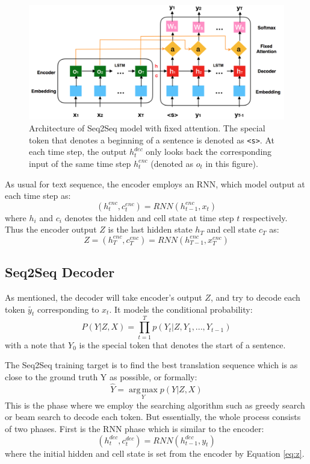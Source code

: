 \documentclass[11pt,a4paper]{article}
\begin{document}
\begin{figure}[ht]
\centering
\includegraphics[width=1.0\linewidth]{archi.png}
\caption{Architecture of Seq2Seq model with fixed attention. The special token that denotes a beginning of a sentence is denoted as \texttt{<s>}. At each time step, the output $h^{dec}_t$ only looks back the corresponding input of the same time step $h^{enc}_t$ (denoted as $o_t$ in this figure).}
\label{fig:fig_architecture}
\end{figure}
As usual for text sequence, the encoder employs an RNN, which model output at each time step as: 
  \begin{equation}
	({h^{enc}_t}, {c^{enc}_t}) = RNN(h^{enc}_{t-1}, x_t)
  \end{equation}
where $h_i$ and $c_i$ denotes the hidden and cell state at time step $t$ respectively. Thus the encoder output $Z$ is the last hidden state $h_T$ and cell state $c_T$ as:
  \begin{equation} \label{eq:z}
      {Z} = ({h^{enc}_T}, {c^{enc}_T}) = RNN(h^{enc}_{T-1}, x^{enc}_T)	
  \end{equation}

\subsection{Seq2Seq Decoder}
As mentioned, the decoder will take encoder's output $Z$, and try to decode each token $\tilde{y_t}$ corresponding to $x_t$. It models the conditional probability: 
  \begin{equation}
      P(Y|Z,X) = \prod_{t=1}^{T} p(Y_t|{Z}, Y_1, ..., Y_{t-1})
  \end{equation}
with a note that $Y_0$ is the special token that denotes the start of a sentence. 

The Seq2Seq training target is to find the best translation sequence which is as close to the ground truth Y as possible, or formally:
  \begin{equation}
      \widehat{Y} = \operatorname*{arg\,max}_{Y} p(Y|Z, X) 
  \end{equation}
This is the phase where we employ the searching algorithm such as greedy search or beam search to decode each token. But essentially, the whole process consists of two phases. First is the RNN phase which is similar to the encoder: 
  \begin{equation}
      (h^{dec}_t, c^{dec}_t) = RNN(h^{dec}_{t-1}, y_t) \label{eq:rnn_dec}
  \end{equation}
where the initial hidden and cell state is set from the encoder by Equation \ref{eq:z}.
\end{document}
